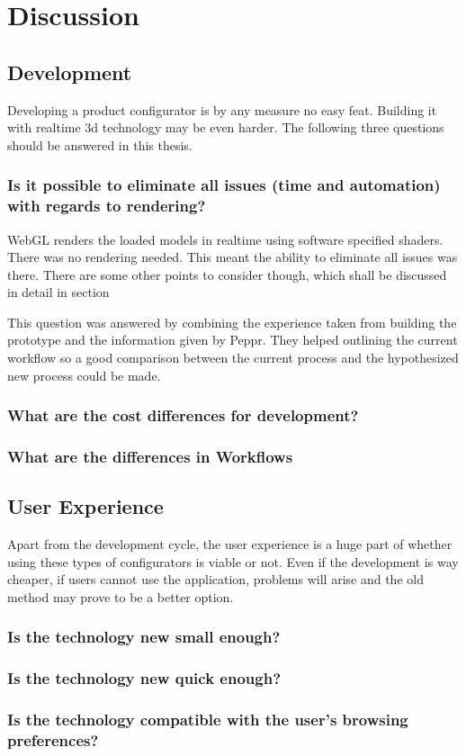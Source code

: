 \chapter{Discussion}
\section{Development}
Developing a product configurator is by any measure no easy feat. Building it with realtime 3d technology may be even harder. The following three questions should be answered in this thesis.

\subsection {Is it possible to eliminate all issues (time and automation) with regards to rendering?}
\label{discuss:developmentElimination}
WebGL renders the loaded models in realtime using software specified shaders. There was no rendering needed. This meant the ability to eliminate all issues was there. There are some other points to consider though, which shall be discussed in detail in section 

This question was answered by combining the experience taken from building the prototype and the information given by Peppr. They helped outlining the current workflow so a good comparison between the current process and the hypothesized new process could be made.


\subsection{What are the cost differences for development?}
\subsection {What are the differences in Workflows}

\section{User Experience}
Apart from the development cycle, the user experience is a huge part of whether using these types of configurators is viable or not. Even if the development is way cheaper, if users cannot use the application, problems will arise and the old method may prove to be a better option.

\subsection {Is the technology new small enough?}
\subsection {Is the technology new quick enough?}
\subsection {Is the technology compatible with the user's browsing preferences?}